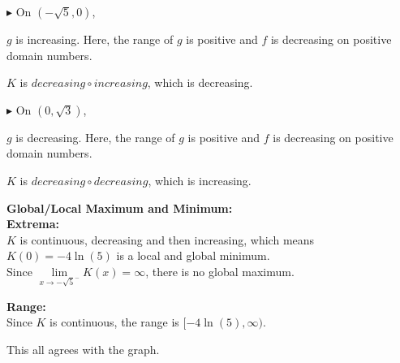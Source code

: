\documentclass{ximera}
\begin{document}
\textbf{\textcolor{blue!55!black}{$\blacktriangleright$}} On $(-\sqrt{5}, 0)$, 


$g$ is increasing. Here, the range of $g$ is positive and $f$ is decreasing on positive domain numbers.

\begin{center}
$K$ is $decreasing \circ increasing$, which is decreasing. \\
\end{center}




\textbf{\textcolor{blue!55!black}{$\blacktriangleright$}} On $(0, \sqrt{3})$, 


$g$ is decreasing. Here, the range of $g$ is positive and $f$ is decreasing on positive domain numbers.


\begin{center}
$K$ is $decreasing \circ decreasing$, which is increasing. \\
\end{center}







\textbf{\textcolor{blue!55!black}{Global/Local Maximum and Minimum:}} \\
\textbf{Extrema:} \\

$K$ is continuous, decreasing and then increasing, which means $K(0) = -4 \ln(5)$ is a local and global minimum. \\



Since $\lim\limits_{x \to -\sqrt{5}^-} K(x) = \infty$,  there is no global maximum.












\textbf{\textcolor{blue!55!black}{Range:}} \\

Since $K$ is continuous, the range is $[-4 \ln(5), \infty)$.




This all agrees with the graph. \\
\end{document}
